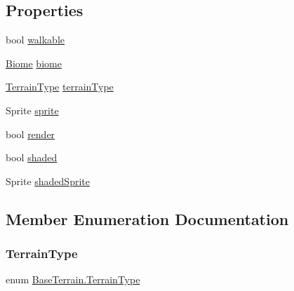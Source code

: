 \subsection*{Properties}
\begin{DoxyCompactItemize}
\item 
bool \mbox{\hyperlink{class_base_terrain_a403d7a199581bc910ecbf15009b532a6}{walkable}}
\item 
\mbox{\hyperlink{class_biome}{Biome}} \mbox{\hyperlink{class_base_terrain_a89f7a3d77182f51a257cf1f503bb6fe9}{biome}}
\item 
\mbox{\hyperlink{class_base_terrain_a5b782f4de5e1a2ca1343b4aa89a7dc9a}{Terrain\+Type}} \mbox{\hyperlink{class_base_terrain_a381e5f59e57a301a70f79c32cf3ea300}{terrain\+Type}}
\item 
Sprite \mbox{\hyperlink{class_base_terrain_a0af7f55356e035cde6cedadae6fbb34d}{sprite}}
\item 
bool \mbox{\hyperlink{class_base_terrain_a845e9830b7282650856b64db83d7633b}{render}}
\item 
bool \mbox{\hyperlink{class_base_terrain_a5c1d125049a42d2b25ef2e09166bbd91}{shaded}}
\item 
Sprite \mbox{\hyperlink{class_base_terrain_a6e60ba346bed94af204ded4f7fcf16ab}{shaded\+Sprite}}
\end{DoxyCompactItemize}


\subsection{Member Enumeration Documentation}
\mbox{\label{class_base_terrain_a5b782f4de5e1a2ca1343b4aa89a7dc9a}} 
\subsubsection{\texorpdfstring{TerrainType}{TerrainType}}
{\footnotesize\ttfamily enum \mbox{\hyperlink{class_base_terrain_a5b782f4de5e1a2ca1343b4aa89a7dc9a}{Base\+Terrain.\+Terrain\+Type}}\hspace{0.3cm}{\ttfamily [strong]}}

